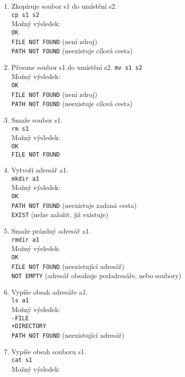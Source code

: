 \documentclass[12pt]{scrartcl}
\begin{document}
\begin{enumerate}
\item Zkopíruje soubor s1 do umístění s2.\\
\texttt{cp s1 s2}\\
Možný výsledek:\\
\texttt{OK}\\
\texttt{FILE NOT FOUND} (není zdroj)\\
\texttt{PATH NOT FOUND} (neexistuje cílová cesta)
\item Přesune soubor s1 do umístění s2.
\texttt{mv s1 s2}\\
Možný výsledek:\\
\texttt{OK}\\
\texttt{FILE NOT FOUND} (není zdroj)\\
\texttt{PATH NOT FOUND} (neexistuje cílová cesta)
\item Smaže soubor s1.\\
\texttt{rm s1}\\
Možný výsledek:\\
\texttt{OK}\\
\texttt{FILE NOT FOUND}
\item Vytvoří adresář a1.\\
\texttt{mkdir a1}\\
Možný výsledek:\\
\texttt{OK}\\
\texttt{PATH NOT FOUND} (neexistuje zadaná cesta)\\
\texttt{EXIST} (nelze založit, již existuje)
\item Smaže prázdný adresář a1.\\
\texttt{rmdir a1}\\
Možný výsledek:\\
\texttt{OK}\\
\texttt{FILE NOT FOUND} (neexistující adresář)\\
\texttt{NOT EMPTY} (adresář obsahuje podadresáře, nebo soubory)
\item Vypíše obsah adresáře a1.\\
\texttt{ls a1}\\
Možný výsledek:\\
\texttt{-FILE}\\
\texttt{+DIRECTORY}\\
\texttt{PATH NOT FOUND} (neexistující adresář)
\item Vypíše obsah souboru s1.\\
\texttt{cat s1}\\
Možný výsledek:\\

\end{enumerate}
\end{document}
